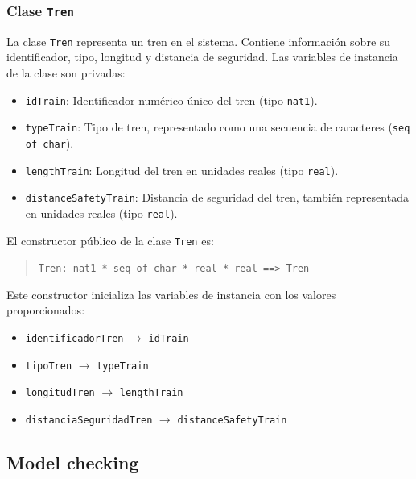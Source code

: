 \documentclass[journal]{IEEEtran}
\begin{document}



    \subsubsection*{Clase \texttt{Tren}}

    La clase \texttt{Tren} representa un tren en el sistema. Contiene información sobre su identificador, tipo, longitud y distancia de seguridad. Las variables de instancia de la clase son privadas:

    \begin{itemize}
    \item \texttt{idTrain}: Identificador numérico único del tren (tipo \texttt{nat1}).
    \item \texttt{typeTrain}: Tipo de tren, representado como una secuencia de caracteres (\texttt{seq of char}).
    \item \texttt{lengthTrain}: Longitud del tren en unidades reales (tipo \texttt{real}).
    \item \texttt{distanceSafetyTrain}: Distancia de seguridad del tren, también representada en unidades reales (tipo \texttt{real}).
    \end{itemize}

    El constructor público de la clase \texttt{Tren} es:

    \begin{quote}
    \texttt{Tren: nat1 * seq of char * real * real \texttt{==>} Tren}
    \end{quote}

    Este constructor inicializa las variables de instancia con los valores proporcionados:

    \begin{itemize}
    \item \texttt{identificadorTren} $\rightarrow$ \texttt{idTrain}
    \item \texttt{tipoTren} $\rightarrow$ \texttt{typeTrain}
    \item \texttt{longitudTren} $\rightarrow$ \texttt{lengthTrain}
    \item \texttt{distanciaSeguridadTren} $\rightarrow$ \texttt{distanceSafetyTrain}
    \end{itemize}



\subsection{Model checking}

\nocite{*}

\sloppy

\end{document}
